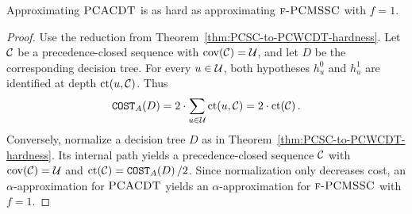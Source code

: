 \begin{theorem}\label{thm:PCMSSC-to-PCACDT-hardness}
    Approximating $\textup{\textsc{PCACDT}}$ is as hard as approximating $\textup{\textsc{f-PCMSSC}}$ with $f=1$.
\end{theorem}
\begin{proof}
    \setlength{\emergencystretch}{1em}
    Use the reduction from Theorem~\ref{thm:PCSC-to-PCWCDT-hardness}. Let $\mathcal{C}$ be a precedence-closed sequence with $\operatorname{cov}\mathopen{}\left( \mathcal{C} \right)=\mathcal{U}$, and let $D$ be the corresponding decision tree. For every $u\in\mathcal{U}$, both hypotheses $h_u^0$ and $h_u^1$ are identified at depth $\operatorname{ct}\mathopen{}\left( u,\mathcal{C} \right)$. Thus
    \[
        \texttt{COST}_A\mathopen{}\left( D \right)=2\cdot\sum_{u\in\mathcal{U}}\operatorname{ct}\mathopen{}\left( u,\mathcal{C} \right)
        =2\cdot\operatorname{ct}\mathopen{}\left( \mathcal{C} \right).
    \]
    Conversely, normalize a decision tree $D$ as in Theorem~\ref{thm:PCSC-to-PCWCDT-hardness}. Its internal path yields a precedence-closed sequence $\mathcal{C}$ with $\operatorname{cov}\mathopen{}\left( \mathcal{C} \right)=\mathcal{U}$ and $\operatorname{ct}\mathopen{}\left( \mathcal{C} \right)=\texttt{COST}_A\mathopen{}\left( D \right)/2$. Since normalization only decreases cost, an $\alpha$-approximation for $\textup{\textsc{PCACDT}}$ yields an $\alpha$-approximation for $\textup{\textsc{f-PCMSSC}}$ with $f=1$.
\end{proof}

